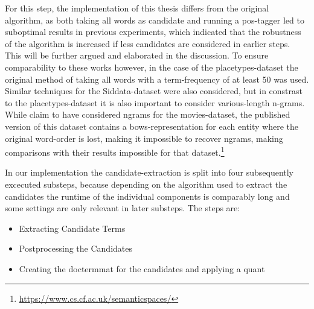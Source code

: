 For this step, the implementation of this thesis differs from the original algorithm, as both taking all words as candidate and running a \gls{pos}-tagger led to suboptimal results in previous experiments, which indicated that the robustness of the algorithm is increased if less candidates are considered in earlier steps. This will be further argued and elaborated in the discussion. To ensure comparability to these works however, in the case of the placetypes-dataset the original method of taking all words with a term-frequency of at least 50 was used. Similar techniques for the Siddata-dataset were also considered, but in constrast to the placetypes-dataset it is also important to consider various-length n-grams. While \textcite{Derrac2015} claim to have considered \glspl{ngram} for the movies-dataset, the published version of this dataset contains a \glspl{bow}-representation for each entity where the original word-order is lost, making it impossible to recover \glspl{ngram}, making comparisons with their results impossible for that dataset.\footnote{\url{https://www.cs.cf.ac.uk/semanticspaces/}}


In our implementation the candidate-extraction is split into four subsequently excecuted substeps, because depending on the algorithm used to extract the candidates the runtime of the individual components is comparably long and some settings are only relevant in later substeps. The steps are:
\begin{itemize}
	\item Extracting Candidate Terms
	\item Postprocessing the Candidates
	\item Creating the \gls{doctermmat} for the candidates and applying a \gls{quant}
\end{itemize}

